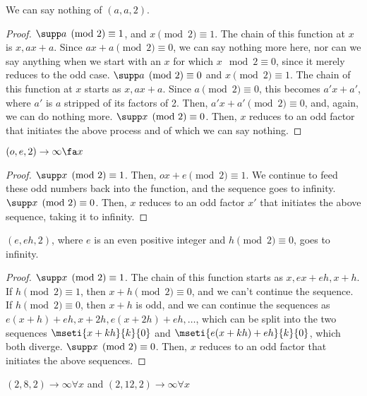 \documentclass[12pt]{article}
\begin{document}
    \begin{lemma}
        We can say nothing of $(a, a, 2)$. 
    \end{lemma}
    \begin{proof}        
        $\supp a \pmod 2 \equiv 1$, and $x \pmod 2 \equiv 1$. The chain of this function at $x$ is $x, ax + a$. Since $ax + a \pmod 2 \equiv 0$, we can say nothing more here, nor can we say anything when we start with an $x$ for which $x \mod 2 \equiv 0$, since it merely reduces to the odd case. \p
        $\supp a \pmod 2 \equiv 0$ and $x \pmod 2 \equiv 1$. The chain of this function at $x$ starts as $x, ax + a$. Since $a \pmod 2 \equiv 0$, this becomes $a'x + a'$, where $a'$ is $a$ stripped of its factors of 2. Then, $a'x + a' \pmod 2 \equiv 0$, and, again, we can do nothing more. \p
        $\supp x \pmod 2 \equiv 0$. Then, $x$ reduces to an odd factor that initiates the above process and of which we can say nothing. 
    \end{proof}

    \begin{lemma}
        $(o, e, 2) \to \infty \fa x$
    \end{lemma}
    \begin{proof}
        $\supp x \pmod 2 \equiv 1$. Then, $ox + e \pmod 2 \equiv 1$. We continue to feed these odd numbers back into the function, and the sequence goes to infinity. \p
        $\supp x \pmod 2 \equiv 0$. Then, $x$ reduces to an odd factor $x'$ that initiates the above sequence, taking it to infinity. 
    \end{proof}

    
    \begin{lemma} \label{lemma:e,eh,2}
        $(e, eh, 2)$, where $e$ is an even positive integer and $h \pmod 2 \equiv 0$, goes to infinity. 
    \end{lemma}
    \begin{proof}
        $\supp x \pmod 2 \equiv 1$. The chain of this function starts as $x, ex + eh, x + h$. If $h \pmod 2 \equiv 1$, then $x + h \pmod 2 \equiv 0$, and we can't continue the sequence. If $h \pmod 2 \equiv 0$, then $x + h$ is odd, and we can continue the sequences as $e(x + h) + eh, x + 2h, e(x + 2h) + eh,\dots$, which can be split into the two sequences $\mseti{x + kh}{k}{0}$ and $\mseti{e(x + kh) + eh}{k}{0}$, which both diverge. \p
        $\supp x \pmod 2 \equiv 0$. Then, $x$ reduces to an odd factor that initiates the above sequences. 
    \end{proof}
    \begin{example}
        $(2, 8, 2) \to \infty \forall x$ and $(2, 12, 2) \to \infty \forall x$
    \end{example}
\end{document}
